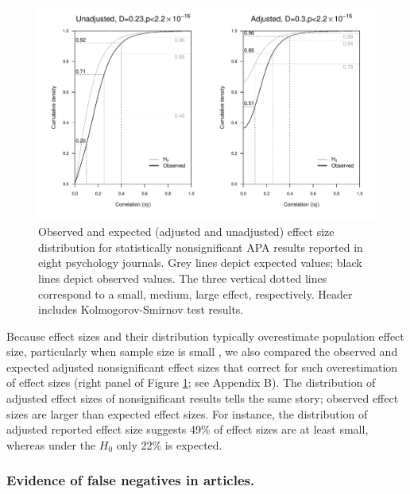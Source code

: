 \documentclass{article}
\begin{document}
\begin{figure}
\begin{center}
\includegraphics[width=\textwidth]{../figures/Fig3.pdf}
\end{center}
\caption{Observed and expected (adjusted and unadjusted) effect size distribution for statistically nonsignificant APA results reported in eight psychology journals. Grey lines depict expected values; black lines depict observed values. The three vertical dotted lines correspond to a small, medium, large effect, respectively. Header includes Kolmogorov-Smirnov test results.}
\label{fig:fig3}
\end{figure}

Because effect sizes and their distribution typically overestimate population effect size, particularly when sample size is small \cite{Voelkle2007-at,Hedges1981-og}, we also compared the observed and expected adjusted nonsignificant effect sizes that correct for such overestimation of effect sizes (right panel of Figure \ref{fig:fig3}; see Appendix B). The distribution of adjusted effect sizes of nonsignificant results tells the same story; observed effect sizes are larger than expected effect sizes. For instance, the distribution of adjusted reported effect size suggests 49\% of effect sizes are at least small, whereas under the $H_0$ only 22\% is expected.

\subsubsection*{Evidence of false negatives in articles.}
\end{document}
